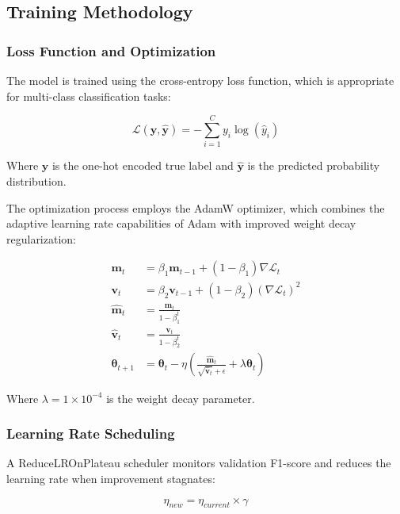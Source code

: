 \documentclass[11pt, a4paper]{article}
\begin{document}
\subsection{Training Methodology}

\subsubsection{Loss Function and Optimization}

The model is trained using the cross-entropy loss function, which is appropriate for multi-class classification tasks:

\begin{equation}
\mathcal{L}(\mathbf{y}, \hat{\mathbf{y}}) = -\sum_{i=1}^{C} y_i \log(\hat{y}_i)
\end{equation}

Where $\mathbf{y}$ is the one-hot encoded true label and $\hat{\mathbf{y}}$ is the predicted probability distribution.

The optimization process employs the AdamW optimizer, which combines the adaptive learning rate capabilities of Adam with improved weight decay regularization:

\begin{align}
\mathbf{m}_t &= \beta_1 \mathbf{m}_{t-1} + (1 - \beta_1) \nabla \mathcal{L}_t \\
\mathbf{v}_t &= \beta_2 \mathbf{v}_{t-1} + (1 - \beta_2) (\nabla \mathcal{L}_t)^2 \\
\hat{\mathbf{m}}_t &= \frac{\mathbf{m}_t}{1 - \beta_1^t} \\
\hat{\mathbf{v}}_t &= \frac{\mathbf{v}_t}{1 - \beta_2^t} \\
\boldsymbol{\theta}_{t+1} &= \boldsymbol{\theta}_t - \eta \left(\frac{\hat{\mathbf{m}}_t}{\sqrt{\hat{\mathbf{v}}_t} + \epsilon} + \lambda \boldsymbol{\theta}_t\right)
\end{align}

Where $\lambda = 1×10^{-4}$ is the weight decay parameter.

\subsubsection{Learning Rate Scheduling}

A ReduceLROnPlateau scheduler monitors validation F1-score and reduces the learning rate when improvement stagnates:

\begin{equation}
\eta_{new} = \eta_{current} \times \gamma
\end{equation}
\end{document}
